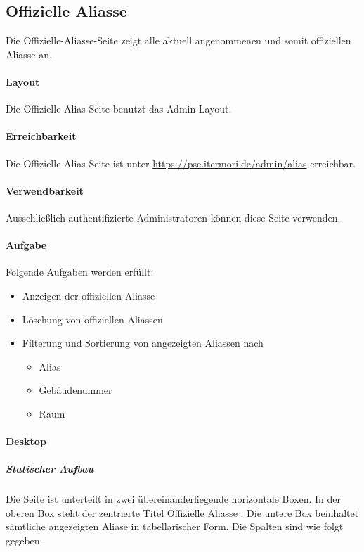 \subsection{Offizielle Aliasse}

Die Offizielle-Aliasse-Seite zeigt alle aktuell angenommenen und somit offiziellen Aliasse an.

\paragraph*{Layout}
Die Offizielle-Alias-Seite benutzt das Admin-Layout.

\paragraph*{Erreichbarkeit}
Die Offizielle-Alias-Seite ist unter \href{https://pse.itermori.de/admin/alias}{https://pse.itermori.de/admin/alias} erreichbar.

\paragraph*{Verwendbarkeit}
Ausschließlich authentifizierte Administratoren können diese Seite verwenden.

\paragraph*{Aufgabe}
Folgende Aufgaben werden erfüllt:

\begin{itemize}
    \item Anzeigen der offiziellen Aliasse
    \item Löschung von offiziellen Aliassen
    \item Filterung und Sortierung von angezeigten Aliassen nach 
    \begin{itemize}
        \item Alias
        \item Gebäudenummer
        \item Raum
    \end{itemize}
\end{itemize}

\paragraph*{Desktop}
\subparagraph*{Statischer Aufbau}
Die Seite ist unterteilt in zwei übereinanderliegende horizontale Boxen.
In der oberen Box steht der zentrierte Titel \dq Offizielle Aliasse \dq.
Die untere Box beinhaltet sämtliche angezeigten Aliase in tabellarischer Form. Die Spalten sind wie folgt gegeben:

